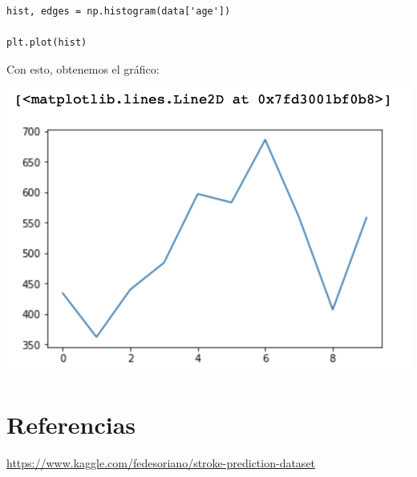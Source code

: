 \documentclass[letter]{article}
\begin{document}
\begin{verbatim}
hist, edges = np.histogram(data['age'])

plt.plot(hist)
\end{verbatim}

Con esto, obtenemos el gráfico:

\begin{center}
\includegraphics[width=.9\linewidth]{./img/hist.png}
\end{center}



\section{Referencias}
\label{sec:org22f1cd8}

\url{https://www.kaggle.com/fedesoriano/stroke-prediction-dataset}
\end{document}
